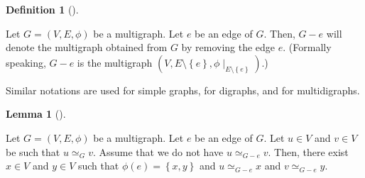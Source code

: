 \documentclass[numbers=enddot,12pt,final,onecolumn,notitlepage]{scrartcl}%
\theoremstyle{definition}
\newtheorem{lem}[theo]{Lemma}
\newenvironment{lemma}[1][]
{\begin{lem}[#1]\begin{leftbar}}
{\end{leftbar}\end{lem}}
\newtheorem{defi}[theo]{Definition}
\newenvironment{definition}[1][]
{\begin{defi}[#1]\begin{leftbar}}
{\end{leftbar}\end{defi}}
\newcommand{\set}[1]{\left\{ #1 \right\}}
\newcommand{\tup}[1]{\left( #1 \right)}
\begin{document}
\begin{definition} \label{def.hw3.conn.G-e}
Let $G = \tup{V, E, \phi}$ be a multigraph.
Let $e$ be an edge of $G$.
Then, $G - e$ will denote the multigraph obtained from $G$ by
removing the edge $e$.
(Formally speaking, $G - e$ is the multigraph
$\tup{V, E \setminus \set{e}, \phi\mid_{E \setminus \set{e}}}$.)
\end{definition}

Similar notations are used for simple graphs, for digraphs,
and for multidigraphs.

\begin{lemma} \label{lem.hw3.conn.uG-ev}
Let $G = \tup{V, E, \phi}$ be a multigraph.
Let $e$ be an edge of $G$.
Let $u \in V$ and $v \in V$ be such that
$u \simeq_G v$.
Assume that we do not have $u \simeq_{G - e} v$.
Then, there exist $x \in V$ and $y \in V$ such that
$\phi\tup{e} = \set{x, y}$ and $u \simeq_{G - e} x$ and
$v \simeq_{G - e} y$.
\end{lemma}
\end{document}
